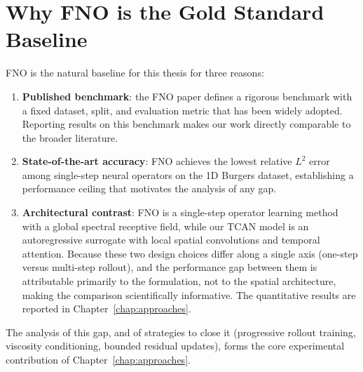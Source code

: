 \section{Why FNO is the Gold Standard Baseline}
\label{sec:fno:baseline}

FNO is the natural baseline for this thesis for three reasons:

\begin{enumerate}
  \item \textbf{Published benchmark}: the FNO paper defines a rigorous benchmark with a fixed dataset, split, and evaluation metric that has been widely adopted. Reporting results on this benchmark makes our work directly comparable to the broader literature.
  \item \textbf{State-of-the-art accuracy}: FNO achieves the lowest relative $L^2$ error among single-step neural operators on the 1D Burgers dataset, establishing a performance ceiling that motivates the analysis of any gap.
  \item \textbf{Architectural contrast}: FNO is a single-step operator learning method with a global spectral receptive field, while our TCAN model is an autoregressive surrogate with local spatial convolutions and temporal attention. Because these two design choices differ along a single axis (one-step versus multi-step rollout), and the performance gap between them is attributable primarily to the formulation, not to the spatial architecture, making the comparison scientifically informative. The quantitative results are reported in Chapter~\ref{chap:approaches}.
\end{enumerate}

The analysis of this gap, and of strategies to close it (progressive rollout training, viscosity conditioning, bounded residual updates), forms the core experimental contribution of Chapter~\ref{chap:approaches}.
